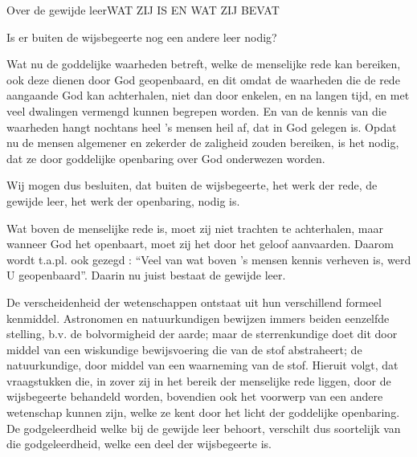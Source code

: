 \documentclass{summa}
\begin{document}
\begin{quaestio}{Over de gewijde leer}{WAT ZIJ IS EN WAT ZIJ BEVAT}
\begin{articulus}{Is er buiten de wijsbegeerte nog een andere leer nodig?}
\begin {respondeo}
      Wat nu de goddelijke waarheden betreft, welke de menselijke rede kan bereiken, ook deze dienen door God geopenbaard, en dit omdat de waarheden die de rede aangaande God kan achterhalen, niet dan door enkelen, en na langen tijd, en met veel dwalingen vermengd kunnen begrepen worden. En van de kennis van die waarheden hangt nochtans heel ’s mensen heil af, dat in God gelegen is. Opdat nu de mensen algemener en zekerder de zaligheid zouden bereiken, is het nodig, dat ze door goddelijke openbaring over God onderwezen worden.  
      
      Wij mogen dus besluiten, dat buiten de wijsbegeerte, het werk der rede, de gewijde leer, het werk der openbaring, nodig is.
    \end {respondeo}
    
    \begin{responsiones}
    \item { Wat boven de menselijke rede is, moet zij niet trachten te achterhalen, maar wanneer God het openbaart, moet zij het door het geloof aanvaarden. Daarom wordt t.a.pl. ook gezegd : “Veel van wat boven ’s mensen kennis verheven is, werd U geopenbaard”. Daarin nu juist bestaat de gewijde leer. }
    \item { De verscheidenheid der wetenschappen ontstaat uit hun verschillend formeel kenmiddel. Astronomen en natuurkundigen bewijzen immers beiden eenzelfde stelling, b.v. de bolvormigheid der aarde; maar de sterrenkundige doet dit door middel van een wiskundige bewijsvoering die van de stof abstraheert; de natuurkundige, door middel van een waarneming van de stof. Hieruit volgt, dat vraagstukken die, in zover zij in het bereik der menselijke rede liggen, door de wijsbegeerte behandeld worden, bovendien ook het voorwerp van een andere wetenschap kunnen zijn, welke ze kent door het licht der goddelijke openbaring. De godgeleerdheid welke bij de gewijde leer behoort, verschilt dus soortelijk van die godgeleerdheid, welke een deel der wijsbegeerte is. }
    \end{responsiones}
  \end{articulus}



\end{quaestio}
\end{document}
